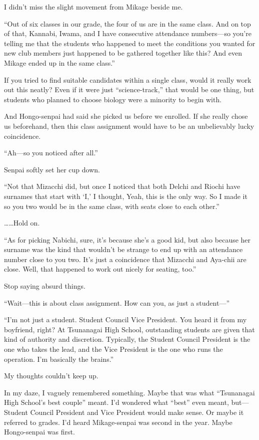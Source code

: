 \documentclass[
    a4paper,
    12pt,
    twoside,
    openany,
    UTF8,
    fontset=windows
]{ctexbook}
\begin{document}
I didn't miss the slight movement from Mikage beside me.

``Out of six classes in our grade, the four of us are in the same class. And on top of that, Kannabi, Iwama, and I have consecutive attendance numbers---so you're telling me that the students who happened to meet the conditions you wanted for new club members just happened to be gathered together like this? And even Mikage ended up in the same class.''

If you tried to find suitable candidates within a single class, would it really work out this neatly? Even if it were just ``science-track,'' that would be one thing, but students who planned to choose biology were a minority to begin with.

And Hongo-senpai had said she picked us before we enrolled. If she really chose us beforehand, then this class assignment would have to be an unbelievably lucky coincidence.

``Ah---so you noticed after all.''

Senpai softly set her cup down.

``Not that Mizacchi did, but once I noticed that both Delchi and Riochi have surnames that start with `I,' I thought, Yeah, this is the only way. So I made it so you two would be in the same class, with seats close to each other.''

\dots\dots Hold on.

``As for picking Nabichi, sure, it's because she's a good kid, but also because her surname was the kind that wouldn't be strange to end up with an attendance number close to you two. It's just a coincidence that Mizacchi and Aya-chii are close. Well, that happened to work out nicely for seating, too.''

Stop saying absurd things.

``Wait---this is about class assignment. How can you, as just a student---''

``I'm not just a student. Student Council Vice President. You heard it from my boyfriend, right? At Tsunanagai High School, outstanding students are given that kind of authority and discretion. Typically, the Student Council President is the one who takes the lead, and the Vice President is the one who runs the operation. I'm basically the brains.''

My thoughts couldn't keep up.

In my daze, I vaguely remembered something. Maybe that was what ``Tsunanagai High School's best couple'' meant. I'd wondered what ``best'' even meant, but---Student Council President and Vice President would make sense. Or maybe it referred to grades. I'd heard Mikage-senpai was second in the year. Maybe Hongo-senpai was first.
\end{document}
